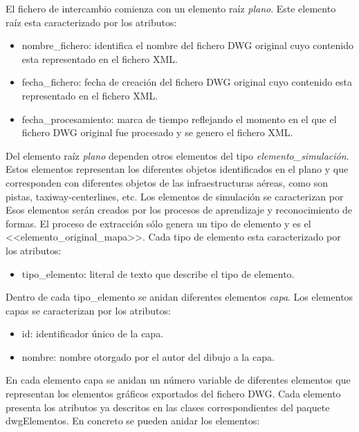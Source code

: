 El fichero de intercambio comienza con un elemento raíz \emph{plano}. Este elemento raíz esta caracterizado por los atributos:

\begin{itemize}

\item{nombre\_fichero: identifica el nombre del fichero DWG original cuyo contenido esta representado en el fichero XML.}

\item{fecha\_fichero: fecha de creación del fichero DWG original cuyo contenido esta representado en el fichero XML.}

\item{fecha\_procesamiento: marca de tiempo reflejando el momento en el que el fichero DWG original fue procesado y se genero el fichero XML.}

\end{itemize}

Del elemento raíz \emph{plano} dependen otros elementos del tipo \emph{elemento\_simulación}. Estos elementos representan los diferentes objetos identificados en el plano y que corresponden con diferentes objetos de las infraestructuras aéreas, como son pistas, taxiway-centerlines, etc. Los elementos de simulación se caracterizan por Esos elementos serán creados por los procesos de aprendizaje y reconocimiento de formas. El proceso de extracción sólo genera un tipo de elemento y es el <<elemento\_original\_mapa>>. Cada tipo de elemento esta caracterizado por los atributos:

\begin{itemize}

\item{tipo\_elemento: literal de texto que describe el tipo de elemento.}

\end{itemize}

Dentro de cada tipo\_elemento se anidan diferentes elementos \emph{capa}. Los elementos capas se caracterizan por los atributos:

\begin{itemize}

\item{id: identificador único de la capa.}
\item{nombre: nombre otorgado por el autor del dibujo a la capa.}

\end{itemize}

En cada elemento capa se anidan un número variable de diferentes elementos que representan los elementos gráficos exportados del fichero DWG. Cada elemento presenta los atributos ya descritos en las clases correspondientes del paquete dwgElementos. En concreto se pueden anidar los elementos:


